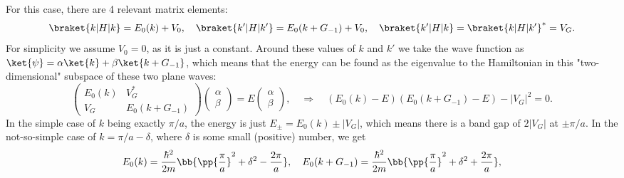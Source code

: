 \documentclass[main.tex]{subfiles}
\begin{document}
	For this case, there are 4 relevant matrix elements:
	\begin{align}
		\braket{k|H|k} = E_0(k) + V_0, \quad \braket{k'|H|k'} = E_0(k+G_{-1}) + V_0, \quad \braket{k'|H|k} = \braket{k|H|k'}^* = V_G.
	\end{align}
	For simplicity we assume $ V_0 = 0 $, as it is just a constant. Around these values of $ k $ and $ k' $ we take the wave function as $ \ket{\psi} = \alpha \ket{k} + \beta \ket{k+G_{-1}} $, which means that the energy can be found as the eigenvalue to the Hamiltonian in this "two-dimensional" subspace of these two plane waves:
	\begin{equation}
		\begin{pmatrix}
			E_0(k) & V_G^* \\ V_G & E_0(k+G_{-1})
		\end{pmatrix} \begin{pmatrix}
		\alpha \\ \beta
		\end{pmatrix} = E \begin{pmatrix}
		\alpha \\ \beta
		\end{pmatrix}, \quad \Rightarrow \quad (E_0(k)-E)(E_0(k+G_{-1})-E) - |V_G|^2 = 0.
	\end{equation}
	In the simple case of $ k $ being exactly $ \pi/a $, the energy is just $ E_{\pm} = E_0(k) \pm | V_G| $, which means there is a band gap of $ 2|V_G| $ at $ \pm \pi/a $. In the not-so-simple case of $ k = \pi/a - \delta $, where $ \delta $ is some small (positive) number, we get
	\begin{equation}
		E_0(k) = \frac{\hbar^2}{2m}\bb{\pp{\frac{\pi}{a}}^2 + \delta^2 - \frac{2\pi}{a}}, \quad E_0(k+G_{-1}) = \frac{\hbar^2}{2m} \bb{\pp{\frac{\pi}{a}}^2 + \delta^2 + \frac{2\pi}{a}},
	\end{equation}
\end{document}
